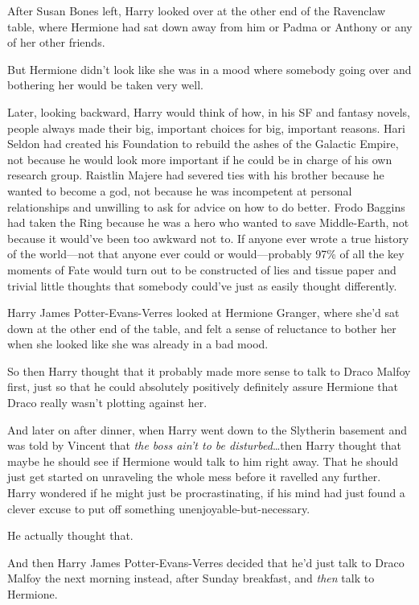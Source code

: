 After Susan Bones left, Harry looked over at the other end of the Ravenclaw
table, where Hermione had sat down away from him or Padma or Anthony or any of
her other friends.

But Hermione didn’t look like she was in a mood where somebody going over and
bothering her would be taken very well.

Later, looking backward, Harry would think of how, in his SF and fantasy
novels, people always made their big, important choices for big, important
reasons. Hari Seldon had created his Foundation to rebuild the ashes of the
Galactic Empire, not because he would look more important if he could be in
charge of his own research group. Raistlin Majere had severed ties with his
brother because he wanted to become a god, not because he was incompetent at
personal relationships and unwilling to ask for advice on how to do better.
Frodo Baggins had taken the Ring because he was a hero who wanted to save
Middle-Earth, not because it would’ve been too awkward not to. If anyone ever
wrote a true history of the world—not that anyone ever could or
would—probably 97\% of all the key moments of Fate would turn out to be
constructed of lies and tissue paper and trivial little thoughts that somebody
could’ve just as easily thought differently.

Harry James Potter-Evans-Verres looked at Hermione Granger, where she’d sat
down at the other end of the table, and felt a sense of reluctance to bother
her when she looked like she was already in a bad mood.

So then Harry thought that it probably made more sense to talk to Draco Malfoy
first, just so that he could absolutely positively definitely assure Hermione
that Draco really wasn’t plotting against her.

And later on after dinner, when Harry went down to the Slytherin basement and
was told by Vincent that \emph{the boss ain’t to be disturbed}…then
Harry thought that maybe he should see if Hermione would talk to him right
away. That he should just get started on unraveling the whole mess before it
ravelled any further. Harry wondered if he might just be procrastinating, if his
mind had just found a clever excuse to put off something
unenjoyable-but-necessary.

He actually thought that.

And then Harry James Potter-Evans-Verres decided that he’d just talk to Draco
Malfoy the next morning instead, after Sunday breakfast, and \emph{then} talk
to Hermione.

